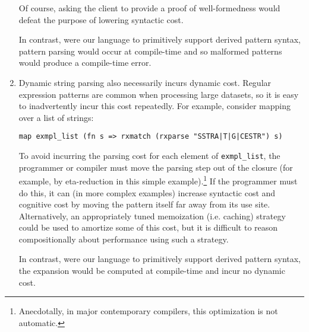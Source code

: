\begin{enumerate}
Of course, asking the client to provide a proof of well-formedness would defeat the purpose of lowering syntactic cost.

In contrast, were our language to primitively support  derived pattern syntax, pattern parsing would occur at compile-time and so malformed patterns would produce a compile-time error.

\item Dynamic string parsing also necessarily incurs dynamic cost. Regular expression patterns are common when processing large datasets, so it is easy to inadvertently incur this cost repeatedly. For example, consider mapping over a list of strings:
\begin{lstlisting}[numbers=none]
map exmpl_list (fn s => rxmatch (rxparse "SSTRA|T|G|CESTR") s)
\end{lstlisting}
To avoid incurring the parsing cost for each element of \lstinline{exmpl_list}, the programmer or compiler must move the parsing step out of the closure (for example, by eta-reduction in this simple example).\footnote{Anecdotally, in major contemporary compilers, this optimization is not automatic.} If the programmer must do this, it can (in more complex examples) increase syntactic cost and cognitive cost by moving the pattern itself far away from its use site. Alternatively, an appropriately tuned memoization (i.e. caching) strategy could be used to amortize some of this cost, but it is difficult to reason compositionally about performance using such a strategy. %


In contrast, were our language to primitively support derived pattern syntax, the expansion would be computed at compile-time and incur no dynamic cost.
\end{enumerate}


